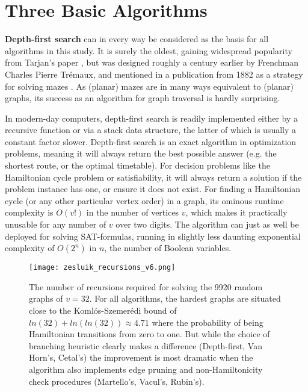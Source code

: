 \documentclass[10pt,conference,compsocconf]{IEEEtran}
\begin{document}


\section{Three Basic Algorithms}

\noindent \textbf{Depth-first search} can in every way be considered as the basis for all algorithms in this study. It is surely the oldest, gaining widespread popularity from Tarjan's paper \cite{tarjan1972depth}, but was designed roughly a century earlier by Frenchman Charles Pierre Tr\'{e}maux, and mentioned in a publication from 1882 as a strategy for solving mazes \cite{lucas1882recreations}. As (planar) mazes are in many ways equivalent to (planar) graphs, its success as an algorithm for graph traversal is hardly surprising.

In modern-day computers, depth-first search is readily implemented either by a recursive function or via a stack data structure, the latter of which is usually a constant factor slower. Depth-first search is an exact algorithm in optimization problems, meaning it will always return the best possible answer (e.g. the shortest route, or the optimal timetable). For decision problems like the Hamiltonian cycle problem or satisfiability, it will always return a solution if the problem instance has one, or ensure it does not exist. For finding a Hamiltonian cycle (or any other particular vertex order) in a graph, its ominous runtime complexity is $O(v!)$ in the number of vertices $v$, which makes it practically unusable for any number of $v$ over two digits. The algorithm can just as well be deployed for solving SAT-formulas, running in slightly less daunting exponential complexity of $O(2^n)$ in $n$, the number of Boolean variables.

\begin{figure*}[h]
    \centering
    \texttt{[image: zesluik\_recursions\_v6.png]}
    \caption{The number of recursions required for solving the 9920 random graphs of $v=32$. For all algorithms, the hardest graphs are situated close to the Koml\'os-Szemer\'edi bound of $ln(32)+ln(ln(32)) \approx 4.71$ where the probability of being Hamiltonian transitions from zero to one. But while the choice of branching heuristic clearly makes a difference (Depth-first, Van Horn's, Cetal's) the improvement is most dramatic when the algorithm also implements edge pruning and non-Hamiltonicity check procedures (Martello's, Vacul's, Rubin's). }
    \label{fig:zesluik_recursions}
\end{figure*}
\end{document}

